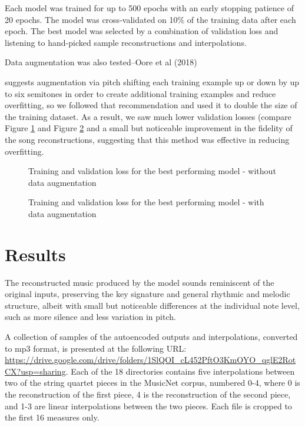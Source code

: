 \documentclass[sigconf,authorversion]{acmart}
\begin{document}
Each model was trained for up to 500 epochs with an early stopping
patience of 20 epochs. The model was cross-validated on 10\% of the
training data after each epoch. The best model was selected by a
combination of validation loss and listening to hand-picked sample
reconstructions and interpolations.

Data augmentation was also tested--Oore et al (2018)

\cite{oore_this_2018} suggests augmentation via pitch shifting each
training example up or down by up to six semitones in order to create
additional training examples and reduce overfitting, so we followed
that recommendation and used it to double the size of the training
dataset. As a result, we saw much lower validation losses (compare
Figure \ref{loss} and Figure \ref{loss_augment} and a small but
noticeable improvement in the fidelity of the song reconstructions,
suggesting that this method was effective in reducing overfitting.

\begin{figure}[htbp]
    \begin{center}
        \scalebox{0.5}{}
    \end{center}
    \caption{Training and validation loss for the best performing model - without data augmentation}
    \label{loss}
\end{figure}

\begin{figure}[htbp]
    \begin{center}
        \scalebox{0.5}{}
    \end{center}
    \caption{Training and validation loss for the best performing model - with data augmentation}
    \label{loss_augment}
\end{figure}


\section{Results}

The reconstructed music produced by the model sounds reminiscent of
the original inputs, preserving the key signature and general rhythmic
and melodic structure, albeit with small but noticeable differences at
the individual note level, such as more silence and less variation in
pitch.

A collection of samples of the autoencoded outputs and interpolations,
converted to mp3 format, is presented at the following URL:
\url{https://drive.google.com/drive/folders/1SlQOI_cL452PftO3KmOYO_qglE2RotCX?usp=sharing}.
Each of the 18 directories contains five interpolations between two of
the string quartet pieces in the MusicNet corpus, numbered 0-4, where
0 is the reconstruction of the first piece, 4 is the reconstruction of
the second piece, and 1-3 are linear interpolations between the two
pieces. Each file is cropped to the first 16 measures only.
\end{document}
